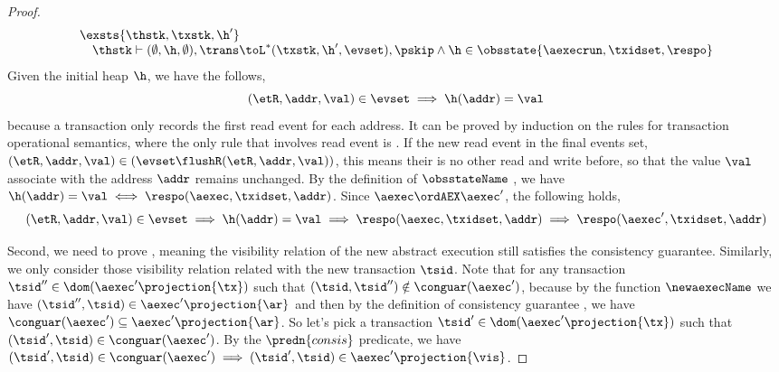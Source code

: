\begin{proof}
    \[
    \begin{array}{@{}l@{}}
        \exsts{\thstk, \txstk, \h'} \nonumber \\
        \quad \thstk \vdash (\emptyset, \h, \emptyset), \trans \toL^{*} (\txstk, \h', \evset), \pskip 
        \land \h \in \obsstate{\aexecrun, \txidset, \respo} \nonumber \\
    \end{array}
    \]
    Given the initial heap \( \h \), we have the follows,
    \begin{equation}
        \label{equ:first-read-from-the-init-heap} 
        (\etR, \addr, \val) \in \evset \implies \h(\addr) = \val
    \end{equation}
    because a transaction only records the first read event for each address.
    It can be proved by induction on the rules for transaction operational semantics, where the only rule that involves read event is .
    If the new read event in the final events set, \ie \( (\etR, \addr, \val) \in ( \evset \flushR (\etR, \addr, \val) ) \), this means their is no other read and write before, so that the value \( \val  \) associate with the address \( \addr \) remains unchanged.
    By the definition of \( \obsstateName \) ,  we have \( \h(\addr) = \val \iff \respo(\aexec, \txidset, \addr) \).
    Since \( \aexec \ordAEX \aexec' \), the following holds,
    \[
        (\etR, \addr, \val) \in \evset \implies \h(\addr) = \val \implies  \respo(\aexec, \txidset, \addr) \implies \respo(\aexec', \txidset, \addr)
    \]
    
    Second, we need to prove , meaning the visibility relation of the new abstract execution still satisfies the consistency guarantee.
    Similarly, we only consider those visibility relation related with the new transaction \( \tsid \).
    Note that for any transaction \( \tsid'' \in \dom(\aexec'\projection{\tx}) \) such that \( (\tsid, \tsid'') \notin \conguar(\aexec') \), because by the function \( \newaexecName \) we have \( (\tsid'', \tsid) \in \aexec'\projection{\ar} \) and then by the definition of consistency guarantee , we have \( \conguar(\aexec') \subseteq \aexec'\projection{\ar}\).
    So let's pick a transaction \( \tsid' \in \dom(\aexec'\projection{\tx}) \) such that \( (\tsid', \tsid) \in \conguar(\aexec') \).
    By the \( \predn{consis}\) predicate, we have \( (\tsid', \tsid) \in \conguar(\aexec') \implies (\tsid', \tsid) \in \aexec'\projection{\vis}\).
\end{proof}


